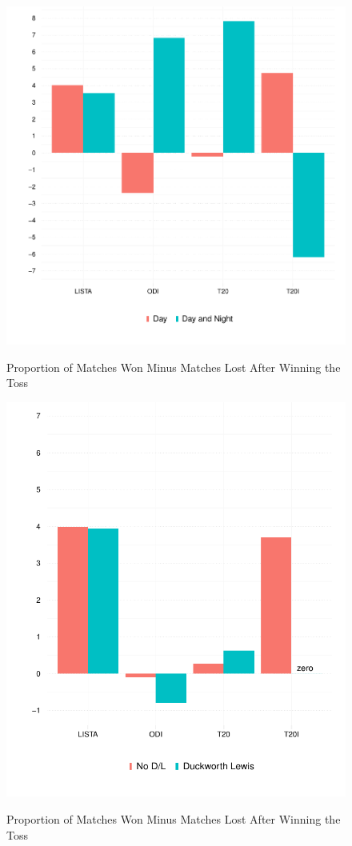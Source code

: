 \documentclass[11pt]{article}
\begin{document}
\begin{figure}[htbp]
\centering
\caption{Proportion of Matches Won Minus Matches Lost After Winning the Toss}
\includegraphics[scale=.85]{../figs/winbyDayNight.pdf}
\label{fig:summary}
\end{figure}


\begin{figure}[htbp]
\centering
\caption{Proportion of Matches Won Minus Matches Lost After Winning the Toss}
\includegraphics[scale=.85]{../figs/winbyDL.pdf}
\label{fig:summary}
\end{figure}
\end{document}
